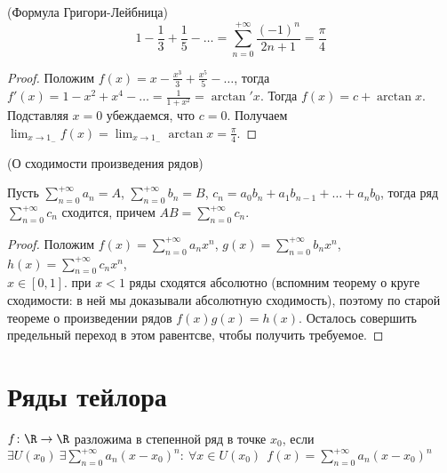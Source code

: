 \begin{theorem}(Формула Григори-Лейбница)
\[
    1 - \frac{1}{3} + \frac{1}{5} - \ldots
    = \sum_{n = 0}^{+\infty}{\frac{(-1)^n}{2n + 1}}
    = \frac{\pi}{4}
\]
\end{theorem}
\begin{proof}
    Положим $\displaystyle f(x) = x - \frac{x^3}{3} + \frac{x^5}{5} - \ldots$,
    тогда $\displaystyle f'(x) = 1 - x^2 + x^4 - \ldots = \frac{1}{1 + x^2} =
    \arctan'{x}$. Тогда $f(x) = c + \arctan{x}$. Подставляя $x = 0$ убеждаемся,
    что $c = 0$. Получаем $\displaystyle \lim_{x \to 1_{-}}{f(x)}
    = \lim_{x \to 1_{-}}{\arctan{x}} = \frac{\pi}{4}$.
\end{proof}

\begin{corollary}(О сходимости произведения рядов)

    Пусть $\displaystyle \sum_{n = 0}^{+\infty}{a_n} = A$, $\displaystyle
    \sum_{n = 0}^{+\infty}{b_n} = B$, $c_n = a_0 b_n + a_1 b_{n - 1} + \ldots
    + a_n b_0$, тогда ряд $\displaystyle \sum_{n = 0}^{+\infty}{c_n}$ сходится,
    причем $\displaystyle AB = \sum_{n = 0}^{+\infty}{c_n}$.
\end{corollary}
\begin{proof}

    Положим $\displaystyle f(x) = \sum_{n = 0}^{+\infty}{a_n x^n}$,
    $\displaystyle g(x) = \sum_{n = 0}^{+\infty}{b_n x^n}$, $\displaystyle h(x)
    = \sum_{n = 0}^{+\infty}{c_n x^n}$, \\ $x \in [0, 1]$. при $x < 1$ ряды
    сходятся абсолютно (вспомним теорему о круге сходимости: в ней мы доказывали
    абсолютную сходимость), поэтому по старой теореме о произведении рядов $f(x)
    g(x) = h(x)$. Осталось совершить предельный переход в этом равентсве, чтобы
    получить требуемое.
\end{proof}

\newpage
\section{Ряды тейлора}

\begin{definition}
    $f \colon \R \to \R$ разложима в степенной ряд в точке $x_0$, если \\
    $\displaystyle \exists U(x_0)~ \exists \sum_{n = 0}^{+\infty}{a_n (x -
    x_0)^n} \colon~ \forall x \in U(x_0)~~ f(x) = \sum_{n = 0}^{+\infty}{a_n
    (x - x_0)^n}$
\end{definition}

